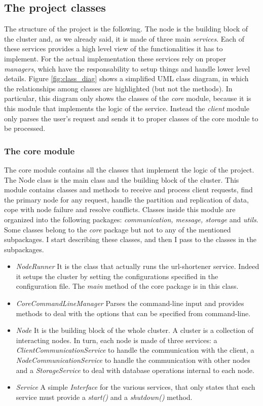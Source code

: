 \documentclass{article}
\begin{document}
\subsection{The project classes} 
The structure of the project is the following. The node is the building block of the cluster and, as we already said, it is made of three main \textit{services}. Each of these services provides a high level view of the functionalities it has to implement. For the actual implementation these services rely on proper \textit{managers}, which have the responsability to setup things and handle lower level details. Figure \ref{fig:class_diag} shows a simplified UML class diagram, in which the relationships among classes are highlighted (but not the methods). In particular, this diagram only shows the classes of the \textit{core} module, because it is this module that implements the logic of the service. Instead the \textit{client} module only parses the user's request and sends it to proper classes of the core module to be processed. \\




\subsubsection{The core module} 
The core module contains all the classes that implement the logic of the project. The Node class is the main class and the building block of the cluster. This module contains classes and methods to receive and process client requests, find the primary node for any request, handle the partition and replication of data, cope with node failure and resolve conflicts. Classes inside this module are organized into the following packages: \textit{communication, message, storage} and \textit{utils}. Some classes belong to the \textit{core} package but not to any of the mentioned subpackages. I start describing these classes, and then I pass to the classes in the subpackages. \\
\begin{itemize}
\item \textit{NodeRunner} It is the class that actually runs the url-shortener service. Indeed it setups the cluster by setting the configurations specified in the configuration file. The \textit{main} method of the core package is in this class.
\item \textit{CoreCommandLineManager} Parses the command-line input and provides methods to deal with the options that can be specified from command-line.
\item \textit{Node} It is the building block of the whole cluster. A cluster is a collection of interacting nodes. In turn, each node is made of three services: a \textit{ClientCommunicationService} to handle the communication with the client, a \textit{NodeCommunicationService} to handle the communication with other nodes and a \textit{StorageService} to deal with database operations internal to each node. 
\item \textit{Service} A simple \textit{Interface} for the various services, that only states that each service must provide a \textit{start()} and a \textit{shutdown()} method.
\end{itemize}
\end{document}
